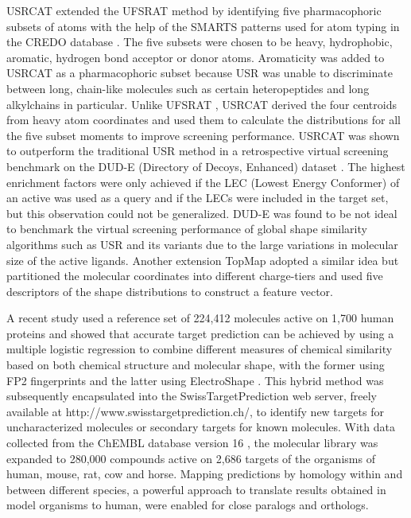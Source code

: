 \documentclass[a4,center,fleqn]{NAR}
\begin{document}
USRCAT \cite{1331} extended the UFSRAT \cite{1436} method by identifying five pharmacophoric subsets of atoms with the help of the SMARTS patterns used for atom typing in the CREDO database \cite{522,1530}. The five subsets were chosen to be heavy, hydrophobic, aromatic, hydrogen bond acceptor or donor atoms. Aromaticity was added to USRCAT as a pharmacophoric subset because USR was unable to discriminate between long, chain-like molecules such as certain heteropeptides and long alkylchains in particular. Unlike UFSRAT \cite{1436}, USRCAT \cite{1331} derived the four centroids from heavy atom coordinates and used them to calculate the distributions for all the five subset moments to improve screening performance. USRCAT was shown to outperform the traditional USR method in a retrospective virtual screening benchmark on the DUD-E (Directory of Decoys, Enhanced) dataset \cite{1185}. The highest enrichment factors were only achieved if the LEC (Lowest Energy Conformer) of an active was used as a query and if the LECs were included in the target set, but this observation could not be generalized. DUD-E was found to be not ideal to benchmark the virtual screening performance of global shape similarity algorithms such as USR and its variants due to the large variations in molecular size of the active ligands. Another extension TopMap \cite{1675} adopted a similar idea but partitioned the molecular coordinates into different charge-tiers and used five descriptors of the shape distributions to construct a feature vector.

A recent study \cite{1407} used a reference set of 224,412 molecules active on 1,700 human proteins and showed that accurate target prediction can be achieved by using a multiple logistic regression to combine different measures of chemical similarity based on both chemical structure and molecular shape, with the former using FP2 fingerprints and the latter using ElectroShape \cite{1338}. This hybrid method was subsequently encapsulated into the SwissTargetPrediction \cite{1408} web server, freely available at http://www.swisstargetprediction.ch/, to identify new targets for uncharacterized molecules or secondary targets for known molecules. With data collected from the ChEMBL database version 16 \cite{1441}, the molecular library was expanded to 280,000 compounds active on 2,686 targets of the organisms of human, mouse, rat, cow and horse. Mapping predictions by homology within and between different species, a powerful approach to translate results obtained in model organisms to human, were enabled for close paralogs and orthologs.
\end{document}
